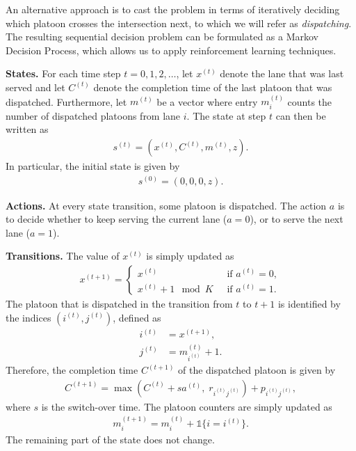 \documentclass{article}
\theoremstyle{definition}
\theoremstyle{plain}
\begin{document}
An alternative approach is to cast the problem in terms of iteratively deciding
which platoon crosses the intersection next, to which we will refer as
\textit{dispatching}. The resulting sequential decision problem can be formulated as a
Markov Decision Process, which allows us to apply reinforcement learning
techniques.

\noindent
\textbf{States.}
For each time step $t=0,1,2,\dots$, let $x^{(t)}$ denote the lane that was last
served and let $C^{(t)}$ denote the completion time of the last platoon that was
dispatched. Furthermore, let $m^{(t)}$ be a vector where entry $m_{i}^{(t)}$ counts the number of dispatched
platoons from lane $i$.
The state at step $t$ can then be written as
\begin{align}
   s^{(t)} = (x^{(t)}, C^{(t)}, m^{(t)}, z) .
\end{align}
In particular, the initial state is given by
\begin{align}
   s^{(0)} = (0, 0, 0, z ) .
\end{align}

\noindent
\textbf{Actions.}
At every state transition, some platoon is dispatched.
The action $a$ is to decide whether to keep serving the
current lane ($a = 0$), or to serve the next lane ($a = 1$).


\noindent
\textbf{Transitions.}
The value of $x^{(t)}$ is simply updated as
\begin{align}
  x^{(t+1)} = \begin{cases}
                x^{(t)} \; & \text{ if } a^{(t)} = 0, \\
                x^{(t)} + 1 \mod K \; & \text{ if } a^{(t)} = 1.
              \end{cases}
\end{align}
The platoon that is dispatched in the transition from $t$ to $t+1$ is identified by the indices $(i^{(t)},j^{(t)})$, defined as
\begin{subequations}
\begin{align}
i^{(t)} &= x^{(t+1)} , \\
j^{(t)} &= m_{i^{(t)}}^{(t)} + 1 .
\end{align}
\end{subequations}
Therefore, the completion time $C^{(t+1)}$ of the dispatched platoon is given by
\begin{align}
  \label{eq:completion_time_update}
  C^{(t+1)} = \max\left( C^{(t)} + s a^{(t)} , \; r_{i^{(t)}j^{(t)}} \right) + p_{i^{(t)}j^{(t)}} ,
\end{align}
where $s$ is the switch-over time.
The platoon counters are simply updated as
\begin{align}
  m_{i}^{(t+1)} = m_{i}^{(t)} + \mathbb{1}\{ i = i^{(t)} \} .
\end{align}
The remaining part of the state does not change.
\end{document}
